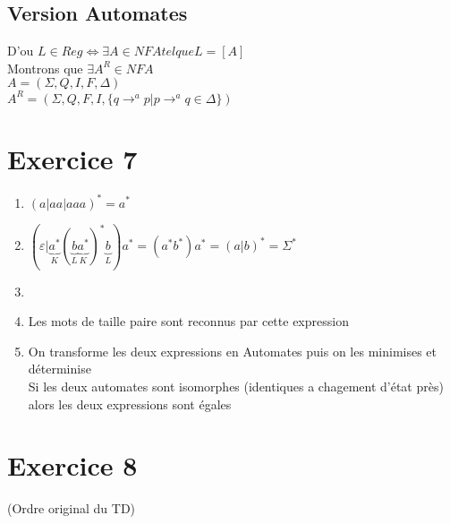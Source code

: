 \documentclass[12pt]{report}
\begin{document}
\subsection*{Version Automates}
D'ou $L \in Reg \Leftrightarrow \exists A \in NFA tel que L =[A]$\\
Montrons que $\exists A^R \in NFA$\\
$A = (\Sigma,Q,I,F,\Delta)$\\
$A^R = (\Sigma,Q,F,I,\lbrace q \to^a p| p \to^a q \in \Delta \rbrace)$

\section{Exercice 7}

\begin{enumerate}
    \item $(a|aa|aaa)^* = a^*$
    \item $(\varepsilon|\underbrace{a^*}_K(\underbrace{b}_L\underbrace{a^*}_K)^*\underbrace{b}_L)a^* = (a^*b^*)a^* = (a|b)^* = \Sigma^*$
    \item 
    \item Les mots de taille paire sont reconnus par cette expression
    \item On transforme les deux expressions en Automates puis on les minimises et déterminise\\
    Si les deux automates sont isomorphes (identiques a chagement d'état près) alors les deux expressions sont égales 
\end{enumerate}

\section{Exercice 8}
(Ordre original du TD)
\end{document}
